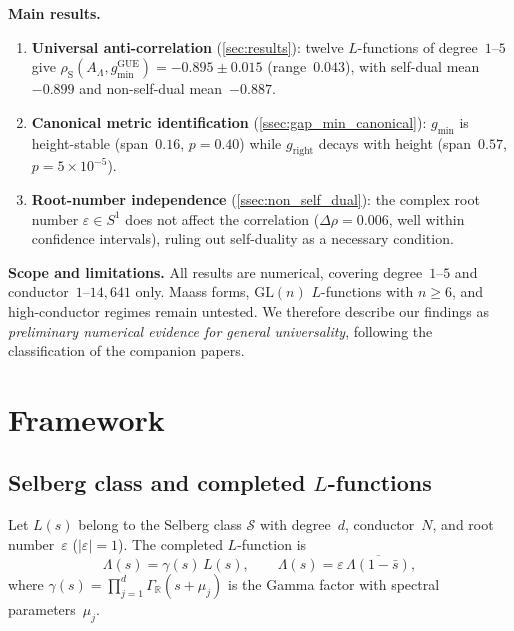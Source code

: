 \documentclass[11pt, a4paper]{article}
\theoremstyle{plain}
\theoremstyle{definition}
\newcommand{\Lam}{\Lambda}
\DeclareMathOperator{\GUE}{GUE}
\begin{document}
\medskip\noindent\textbf{Main results.}\;
\begin{enumerate}
  \item \textbf{Universal anti-correlation}
        (\cref{sec:results}): twelve $L$-functions of degree~$1$--$5$
        give $\rho_{\mathrm{S}}(A_\Lam, g_{\min}^{\GUE})
        = -0.895 \pm 0.015$ (range~$0.043$), with self-dual
        mean~$-0.899$ and non-self-dual mean~$-0.887$.
  \item \textbf{Canonical metric identification}
        (\cref{ssec:gap_min_canonical}): $g_{\min}$ is
        height-stable (span~$0.16$, $p = 0.40$) while
        $g_{\mathrm{right}}$ decays with height (span~$0.57$,
        $p = 5 \times 10^{-5}$).
  \item \textbf{Root-number independence}
        (\cref{ssec:non_self_dual}): the complex root number
        $\varepsilon \in S^1$ does not affect the correlation
        ($\Delta\rho = 0.006$, well within confidence intervals),
        ruling out self-duality as a necessary condition.
\end{enumerate}

\medskip\noindent\textbf{Scope and limitations.}\;
All results are numerical, covering degree~$1$--$5$ and
conductor~$1$--$14{,}641$ only.
Maass forms, $\mathrm{GL}(n)$ $L$-functions with $n \ge 6$,
and high-conductor regimes remain untested.
We therefore describe our findings as \emph{preliminary numerical
evidence for general universality}, following the classification
of the companion papers.


\section{Framework}
\label{sec:framework}

\subsection{Selberg class and completed $L$-functions}

Let $L(s)$ belong to the Selberg class $\mathcal{S}$ with
degree~$d$, conductor~$N$, and root number~$\varepsilon$
($|\varepsilon| = 1$).
The completed $L$-function is
\begin{equation}\label{eq:FE}
  \Lam(s) = \gamma(s)\, L(s), \qquad
  \Lam(s) = \varepsilon\, \overline{\Lam(1 - \bar{s})},
\end{equation}
where $\gamma(s) = \prod_{j=1}^{d} \Gamma_{\mathbb{R}}(s + \mu_j)$
is the Gamma factor with spectral parameters~$\mu_j$.
\end{document}
